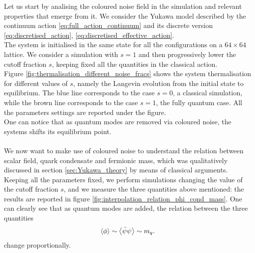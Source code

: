 Let us start by analising the coloured noise field in the simulation and relevant properties that emerge from it. We consider the Yukawa model described by the continuum action \eqref{eq:full_action_continuum} and its discrete version \eqref{eq:discretised_action}, \eqref{eq:discretised_effective_action}.\\
The system is initialised in the same state for all the configurations on a $64 \times 64$ lattice. We consider a simulation with $s=1$ and then progressively lower the cutoff fraction $s$, keeping fixed all the quantities in the classical action. \\
Figure \ref{fig:thermalisation_different_noise_fracs} shows the system thermalisation for different values of $s$, namely the Langevin evolution from the initial state to equilibrium. The blue line corresponds to the case $s=0$, a classical simulation, while the brown line corresponds to the case $s=1$, the fully quantum case.  All the parameters settings are reported under the figure. \\
One can notice that as quantum modes are removed via coloured noise, the systems shifts its equilibrium point. \\~\\ 
We now want to make use of coloured noise to understand the relation between scalar field, quark condensate and fermionic mass, which was qualitatively discussed in section \ref{sec:Yukawa_theory} by means of classical arguments. \\
Keeping all the parameters fixed, we perform simulations changing the value of the cutoff fraction $s$, and we measure the three quantities above mentioned: the results are reported in figure \ref{fig:interpolation_relation_phi_cond_mass}. 
One can clearly see that as quantum modes are added, the relation between the three quantities
\begin{equation*}
	\left\langle \phi \right\rangle \sim \left\langle \bar\psi\psi \right\rangle \sim m_q.
\end{equation*}
change proportionally.
